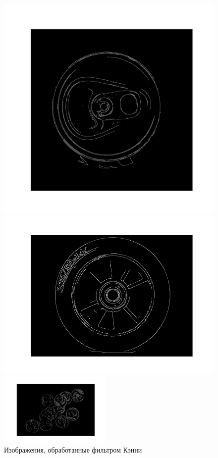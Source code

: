 \documentclass[a4paper,12pt]{article}
\begin{document}
\begin{figure}[H]
    \centering
    \begin{minipage}{0.48\textwidth}
        \centering
        \includegraphics[width=\textwidth]{images/hough_circles/1_proc_canny.png}
    \end{minipage}
    \begin{minipage}{0.48\textwidth}
        \centering
        \includegraphics[width=\textwidth]{images/hough_circles/3_proc_canny.png}
    \end{minipage}
    \includegraphics[width=0.48\textwidth]{images/hough_circles/2_proc_canny.png}
    \caption{Изображения, обработанные фильтром Кэнни}
\end{figure}
\end{document}
